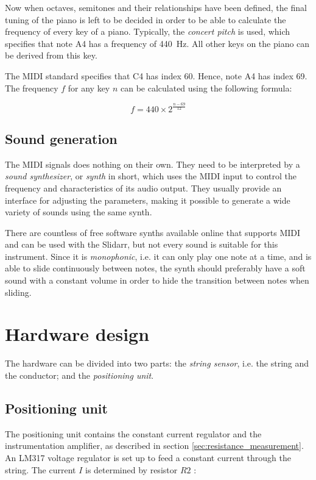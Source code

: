 \documentclass{article}
\begin{document}
Now when octaves, semitones and their relationships have been defined, the final tuning of the piano is left to be decided in order to be able to calculate the frequency of every key of a piano. Typically, the \textit{concert pitch} is used, which specifies that note A4 has a frequency of \SI{440}{\hertz}. All other keys on the piano can be derived from this key.

The MIDI standard specifies that C4 has index 60. Hence, note A4 has index 69. The frequency $f$ for any key $n$ can be calculated using the following formula:

$$ f = 440 \times 2^{\frac{n-69}{12}} $$

\subsection{Sound generation}
The MIDI signals does nothing on their own. They need to be interpreted by a \textit{sound synthesizer}, or \textit{synth} in short, which uses the MIDI input to control the frequency and characteristics of its audio output. They usually provide an interface for adjusting the parameters, making it possible to generate a wide variety of sounds using the same synth. 

There are countless of free software synths available online that supports MIDI and can be used with the Slidarr, but not every sound is suitable for this instrument. Since it is \textit{monophonic}, i.e. it can only play one note at a time, and is able to slide continuously between notes, the synth should preferably have a soft sound with a constant volume in order to hide the transition between notes when sliding.

\section{Hardware design}


The hardware can be divided into two parts: the \textit{string sensor}, i.e. the string and the conductor; and the \textit{positioning unit}.

\subsection{Positioning unit}
The positioning unit contains the constant current regulator and the instrumentation amplifier, as described in section \ref{sec:resistance_measurement}. An LM317 voltage regulator is set up to feed a constant current through the string. The current $I$ is determined by resistor $R2$ \cite{lm317}:
\end{document}
